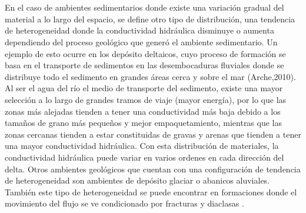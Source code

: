 \\
\\ 
En el caso de ambientes sedimentarios donde existe una variación gradual del material a lo largo del espacio, se define otro tipo de distribución, una tendencia de heterogeneidad donde la conductividad hidráulica disminuye o aumenta dependiendo del proceso geológico que generó el ambiente sedimentario. Un ejemplo de esto ocurre en los depósito deltaicos, cuyo proceso de formación se basa en el transporte de sedimentos  en las desembocaduras fluviales donde se distribuye todo el sedimento en grandes áreas cerca y sobre el mar (Arche,2010). Al ser el agua del río el medio de transporte del sedimento, existe una mayor selección a lo largo de grandes tramos de viaje (mayor energía), por lo que las zonas más alejadas tienden a tener una conductividad más baja debido a los tamaños de grano más pequeños y mejor empaquetamiento, mientras que las zonas cercanas tienden a estar constituidas de gravas y arenas que tienden a tener una mayor conductividad hidráulica. Con esta distribución de materiales, la conductividad hidráulica puede variar en varios ordenes en cada dirección del delta. Otros ambientes geológicos que cuentan con una configuración de tendencia de heterogeneidad son ambientes de depósito glaciar o abanicos aluviales. También este tipo de heterogeneidad se puede encontrar en formaciones donde el movimiento del flujo se ve condicionado por fracturas y diaclasas \cite{Arche2010}. 

